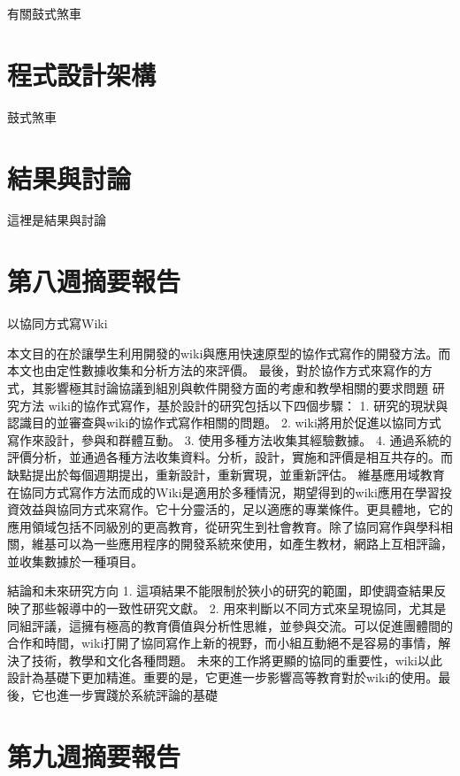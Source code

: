 \documentclass[]{article}
\begin{document}
有關鼓式煞車

\section{程式設計架構}\label{ux7a0bux5f0fux8a2dux8a08ux67b6ux69cb-12}

鼓式煞車

\section{結果與討論}\label{ux7d50ux679cux8207ux8a0eux8ad6-12}

這裡是結果與討論

\section{第八週摘要報告}\label{ux7b2cux516bux9031ux6458ux8981ux5831ux544a}

以協同方式寫Wiki

本文目的在於讓學生利用開發的wiki與應用快速原型的協作式寫作的開發方法。而本文也由定性數據收集和分析方法的來評價。
最後，對於協作方式來寫作的方式，其影響極其討論協議到組別與軟件開發方面的考慮和教學相關的要求問題
研究方法 wiki的協作式寫作，基於設計的研究包括以下四個步驟： 1.
研究的現狀與認識目的並審查與wiki的協作式寫作相關的問題。 2.
wiki將用於促進以協同方式寫作來設計，參與和群體互動。 3.
使用多種方法收集其經驗數據。 4.
通過系統的評價分析，並通過各種方法收集資料。分析，設計，實施和評價是相互共存的。而缺點提出於每個週期提出，重新設計，重新實現，並重新評估。
維基應用域教育在協同方式寫作方法而成的Wiki是適用於多種情況，期望得到的wiki應用在學習投資效益與協同方式來寫作。它十分靈活的，足以適應的專業條件。更具體地，它的應用領域包括不同級別的更高教育，從研究生到社會教育。除了協同寫作與學科相關，維基可以為一些應用程序的開發系統來使用，如產生教材，網路上互相評論，並收集數據於一種項目。

結論和未來研究方向 1.
這項結果不能限制於狹小的研究的範圍，即使調查結果反映了那些報導中的一致性研究文獻。
2.
用來判斷以不同方式來呈現協同，尤其是同組評議，這擁有極高的教育價值與分析性思維，並參與交流。可以促進團體間的合作和時間，wiki打開了協同寫作上新的視野，而小組互動絕不是容易的事情，解決了技術，教學和文化各種問題。
未來的工作將更顯的協同的重要性，wiki以此設計為基礎下更加精進。重要的是，它更進一步影響高等教育對於wiki的使用。最後，它也進一步實踐於系統評論的基礎

\section{第九週摘要報告}\label{ux7b2cux4e5dux9031ux6458ux8981ux5831ux544a}
\end{document}
